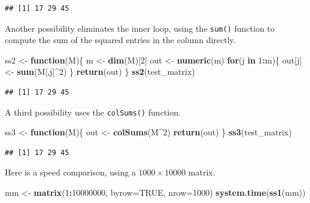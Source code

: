 \documentclass[
]{krantz}
\newenvironment{Shaded}{\begin{snugshade}}{\end{snugshade}}
\newcommand{\ControlFlowTok}[1]{\textcolor[rgb]{0.13,0.29,0.53}{\textbf{#1}}}
\newcommand{\DataTypeTok}[1]{\textcolor[rgb]{0.13,0.29,0.53}{#1}}
\newcommand{\DecValTok}[1]{\textcolor[rgb]{0.00,0.00,0.81}{#1}}
\newcommand{\KeywordTok}[1]{\textcolor[rgb]{0.13,0.29,0.53}{\textbf{#1}}}
\newcommand{\NormalTok}[1]{#1}
\newcommand{\OperatorTok}[1]{\textcolor[rgb]{0.81,0.36,0.00}{\textbf{#1}}}
\newcommand{\OtherTok}[1]{\textcolor[rgb]{0.56,0.35,0.01}{#1}}
\newcommand{\StringTok}[1]{\textcolor[rgb]{0.31,0.60,0.02}{#1}}
\begin{document}
\begin{verbatim}
## [1] 17 29 45
\end{verbatim}

Another possibility eliminates the inner loop, using the \texttt{sum()} function to compute the sum of the squared entries in the column directly.

\begin{Shaded}
\begin{Highlighting}[]
\NormalTok{ss2 \textless{}{-}}\StringTok{ }\ControlFlowTok{function}\NormalTok{(M)\{}
\NormalTok{    m \textless{}{-}}\StringTok{ }\KeywordTok{dim}\NormalTok{(M)[}\DecValTok{2}\NormalTok{]}
\NormalTok{    out \textless{}{-}}\StringTok{ }\KeywordTok{numeric}\NormalTok{(m)}
    \ControlFlowTok{for}\NormalTok{(j }\ControlFlowTok{in} \DecValTok{1}\OperatorTok{:}\NormalTok{m)\{}
\NormalTok{        out[j] \textless{}{-}}\StringTok{ }\KeywordTok{sum}\NormalTok{(M[,j]}\OperatorTok{\^{}}\DecValTok{2}\NormalTok{)}
\NormalTok{    \}}
    \KeywordTok{return}\NormalTok{(out) }
\NormalTok{\}}
\KeywordTok{ss2}\NormalTok{(test\_matrix)}
\end{Highlighting}
\end{Shaded}

\begin{verbatim}
## [1] 17 29 45
\end{verbatim}

A third possibility uses the \texttt{colSums()} function.

\begin{Shaded}
\begin{Highlighting}[]
\NormalTok{ss3 \textless{}{-}}\StringTok{ }\ControlFlowTok{function}\NormalTok{(M)\{}
\NormalTok{    out \textless{}{-}}\StringTok{ }\KeywordTok{colSums}\NormalTok{(M}\OperatorTok{\^{}}\DecValTok{2}\NormalTok{)}
    \KeywordTok{return}\NormalTok{(out)}
\NormalTok{\}}
\KeywordTok{ss3}\NormalTok{(test\_matrix)}
\end{Highlighting}
\end{Shaded}

\begin{verbatim}
## [1] 17 29 45
\end{verbatim}

Here is a speed comparison, using a \(1000\times 10000\) matrix.

\begin{Shaded}
\begin{Highlighting}[]
\NormalTok{mm \textless{}{-}}\StringTok{ }\KeywordTok{matrix}\NormalTok{(}\DecValTok{1}\OperatorTok{:}\DecValTok{10000000}\NormalTok{, }\DataTypeTok{byrow=}\OtherTok{TRUE}\NormalTok{, }\DataTypeTok{nrow=}\DecValTok{1000}\NormalTok{)}
\KeywordTok{system.time}\NormalTok{(}\KeywordTok{ss1}\NormalTok{(mm))}
\end{Highlighting}
\end{Shaded}
\end{document}
